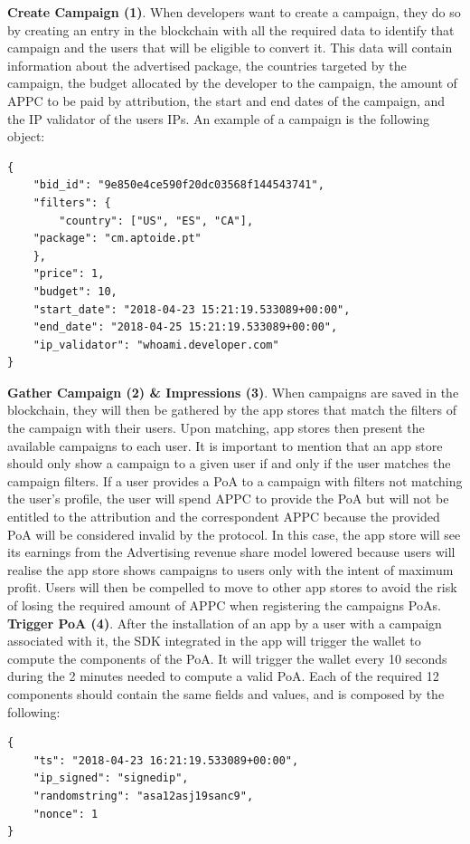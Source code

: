 \noindent \textbf{Create Campaign (1)}. When developers want to create a campaign, they do so by creating an entry in the blockchain with all the required data to identify that campaign and the users that will be eligible to convert it. This data will contain information about the advertised package, the countries targeted by the campaign, the budget allocated by the developer to the campaign, the amount of APPC to be paid by attribution, the start and end dates of the campaign, and the IP validator of the users IPs. An example of a campaign is the following object:
\begin{tcolorbox}[enhanced jigsaw,sharp corners, drop fuzzy shadow=ShadowColor]
\begin{lstlisting}[xleftmargin=0.05\textwidth]
{
    "bid_id": "9e850e4ce590f20dc03568f144543741",
    "filters": {
        "country": ["US", "ES", "CA"],
	"package": "cm.aptoide.pt"
    },
    "price": 1,
    "budget": 10,
    "start_date": "2018-04-23 15:21:19.533089+00:00",
    "end_date": "2018-04-25 15:21:19.533089+00:00",
    "ip_validator": "whoami.developer.com"
}
\end{lstlisting}
\end{tcolorbox}

\noindent \textbf{Gather Campaign (2) \& Impressions (3)}. When campaigns are saved in the blockchain, they will then be gathered by the app stores that match the filters of the campaign with their users. Upon matching, app stores then present the available campaigns to each user. It is important to mention that an app store should only show a campaign to a given user if and only if the user matches the campaign filters. If a user provides a \textsf{PoA} to a campaign with filters not matching the user's profile, the user will spend APPC to provide the \textsf{PoA} but will not be entitled to the attribution and the correspondent APPC because the provided \textsf{PoA} will be considered invalid by the protocol. In this case, the app store will see its earnings from the Advertising revenue share model lowered because users will realise the app store shows campaigns to users only with the intent of maximum profit. Users will then be compelled to move to other app stores to avoid the risk of losing the required amount of APPC when registering the campaigns \textsf{PoAs}.\\

\noindent \textbf{Trigger \textsf{PoA} (4)}. After the installation of an app by a user with a campaign associated with it, the SDK integrated in the app will trigger the wallet to compute the components of the \textsf{PoA}. It will trigger the wallet every 10 seconds during the 2 minutes needed to compute a valid \textsf{PoA}. Each of the required 12 components should contain the same fields and values, and is composed by the following:
\begin{tcolorbox}[enhanced jigsaw,sharp corners, drop fuzzy shadow=ShadowColor]
\begin{lstlisting}[xleftmargin=0.05\textwidth]
{
    "ts": "2018-04-23 16:21:19.533089+00:00",
    "ip_signed": "signedip",
    "randomstring": "asa12asj19sanc9",
    "nonce": 1
}
\end{lstlisting}
\end{tcolorbox}


